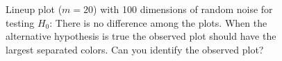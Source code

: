 \documentclass[12]{report}
\begin{document}

\begin{figure}[hbtp]
   \centering
       \caption{Lineup plot ($m=20$) with 100 dimensions of random noise for testing $H_0$: There is no difference among the plots. When the alternative hypothesis is true the observed plot should have the largest separated colors. Can you identify the observed plot?}
     \label{fig:test_category_1d}
\end{figure}
\end{document}
